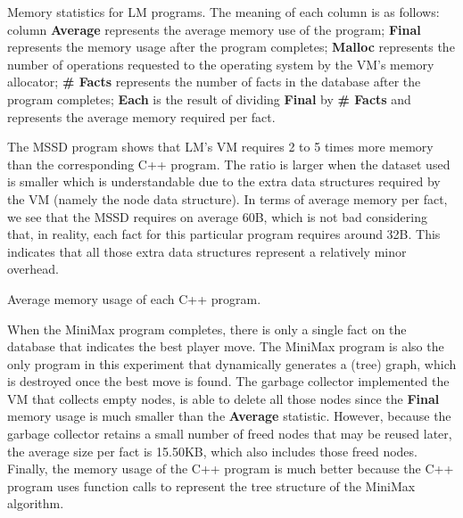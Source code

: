 \begin{table}[ht]
   \begin{center}
      
   \end{center}
   \caption{Memory statistics for LM programs. The meaning of each column is as
      follows: column \textbf{Average} represents the average memory use of the
      program; \textbf{Final} represents the memory usage after the program
      completes; \textbf{Malloc} represents the number of 
   operations requested to the operating system by the VM's memory allocator;
   \textbf{\# Facts} represents the number of facts in the database after the
   program completes; \textbf{Each} is the result of dividing \textbf{Final} by
   \textbf{\# Facts} and represents the average memory required per fact.}
   \label{table:implementation:mem}
\end{table}

The MSSD program shows that LM's VM requires 2 to 5 times more memory than the
corresponding C++ program. The ratio is larger when the dataset used is smaller
which is understandable due to the extra data structures required by the VM
(namely the node data structure). In terms of average memory per fact, we see
that the MSSD requires on average 60B, which is not bad considering that, in
reality, each fact for this particular program requires around 32B. This
indicates that all those extra data structures represent a relatively minor
overhead.

\begin{table}[ht]
   \begin{center}
      
   \end{center}
   \caption{Average memory usage of each C++ program.}
   \label{table:implementation:cmem}
\end{table}


When the MiniMax program completes, there is only a single fact on the database
that indicates the best player move. The MiniMax program is also the only
program in this experiment that dynamically generates a (tree) graph, which is
destroyed once the best move is found. The garbage collector implemented the VM
that collects empty nodes, is able to delete all those nodes since the
\textbf{Final} memory usage is much smaller than the \textbf{Average} statistic.
However, because the garbage collector retains a small number of freed nodes
that may be reused later, the average size per fact is 15.50KB, which also
includes those freed nodes. Finally, the memory usage of the C++ program is much
better because the C++ program uses function calls to represent the tree
structure of the MiniMax algorithm.

